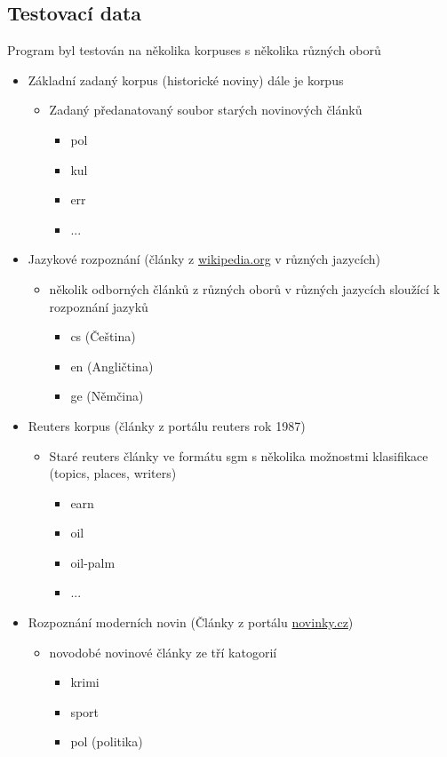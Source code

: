\documentclass[a4paper,12pt]{article}
\begin{document}
\subsection{Testovací data}
Program byl testován na několika korpuses s několika různých oborů
\begin{itemize}
  \item Základní zadaný korpus (historické noviny) dále je korpus
   \begin{itemize}
  \item Zadaný předanatovaný soubor starých novinových článků
  \begin{itemize}
    \item pol
    \item kul
    \item err
    \item ...
  \end{itemize}
    \end{itemize}
  \item Jazykové rozpoznání (články z \url{wikipedia.org} v různých jazycích)
  \begin{itemize}
  \item několik odborných článků z různých oborů v různých jazycích sloužící k rozpoznání jazyků
  \begin{itemize}
    \item cs (Čeština)
    \item en (Angličtina)
    \item ge (Němčina)
  \end{itemize}
  \end{itemize}
  \item Reuters korpus (články z portálu reuters rok 1987)
   \begin{itemize}
  \item Staré reuters články ve formátu sgm s několika možnostmi klasifikace (topics, places, writers)
   \begin{itemize}
    \item earn
    \item oil
    \item oil-palm
    \item ...
  \end{itemize}
  \end{itemize}
  \item Rozpoznání moderních novin (Články z portálu \url{novinky.cz})
  \begin{itemize}
  \item novodobé novinové články ze tří katogorií 
   \begin{itemize}
    \item krimi
    \item sport
    \item pol (politika)
  \end{itemize}
    \end{itemize}
\end{itemize}
\end{document}
